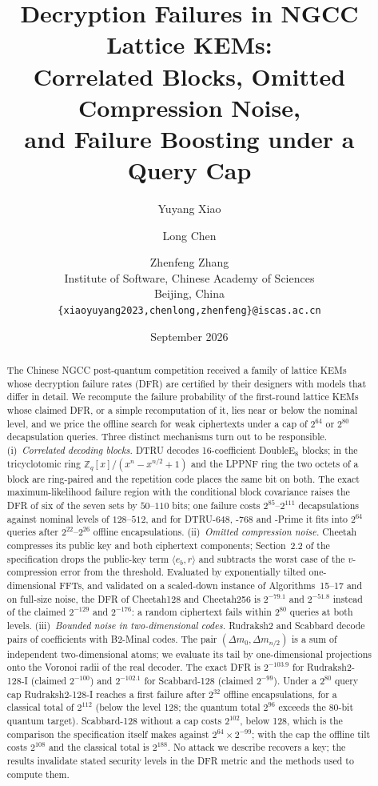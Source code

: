 \documentclass[11pt,a4paper]{article}
\title{Decryption Failures in NGCC Lattice KEMs:\\
Correlated Blocks, Omitted Compression Noise,\\
and Failure Boosting under a Query Cap}
\author{%
Yuyang Xiao \and Long Chen \and Zhenfeng Zhang\\
Institute of Software, Chinese Academy of Sciences\\
Beijing, China\\
\texttt{\{xiaoyuyang2023,chenlong,zhenfeng\}@iscas.ac.cn}}
\date{September 2026}
\theoremstyle{definition}
\theoremstyle{remark}
\newcommand{\Z}{\mathbb{Z}}
\begin{document}
\maketitle

\begin{abstract}
The Chinese NGCC post-quantum competition received a family of lattice KEMs
whose decryption failure rates (DFR) are certified by their designers with
models that differ in detail. We recompute the failure probability of the
first-round lattice KEMs whose claimed DFR, or a simple recomputation of it,
lies near or below the nominal level, and we price the offline search for
weak ciphertexts under a cap of $2^{64}$ or $2^{80}$ decapsulation queries.
Three distinct mechanisms turn out to be responsible.
(i)~\emph{Correlated decoding blocks.} DTRU decodes 16-coefficient
DoubleE$_8$ blocks; in the tricyclotomic ring $\Z_q[x]/(x^n-x^{n/2}+1)$ and
the LPPNF ring the two octets of a block are ring-paired and the repetition
code places the same bit on both. The exact maximum-likelihood failure region
with the conditional block covariance raises the DFR of six of the seven sets
by $50$--$110$ bits; one failure costs $2^{85}$--$2^{111}$ decapsulations
against nominal levels of $128$--$512$, and for DTRU-648, -768 and -Prime it
fits into $2^{64}$ queries after $2^{22}$--$2^{26}$ offline encapsulations.
(ii)~\emph{Omitted compression noise.} Cheetah compresses its public key and
both ciphertext components; Section~2.2 of the specification drops the
public-key term $\langle e_b,r\rangle$ and subtracts the worst case of the
$v$-compression error from the threshold. Evaluated by exponentially tilted
one-dimensional FFTs, and validated on a scaled-down instance of
Algorithms~15--17 and on full-size noise, the DFR of Cheetah128 and
Cheetah256 is $2^{-79.1}$ and $2^{-51.8}$ instead of the claimed $2^{-129}$
and $2^{-176}$: a random ciphertext fails within $2^{80}$ queries at both
levels.
(iii)~\emph{Bounded noise in two-dimensional codes.} Rudraksh2 and Scabbard
decode pairs of coefficients with B2-Minal codes. The pair
$(\Delta m_0,\Delta m_{n/2})$ is a sum of independent two-dimensional atoms;
we evaluate its tail by one-dimensional projections onto the Voronoi radii
of the real decoder. The exact DFR is $2^{-103.9}$ for Rudraksh2-128-I
(claimed $2^{-100}$) and $2^{-102.1}$ for Scabbard-128 (claimed $2^{-99}$).
Under a $2^{80}$ query cap Rudraksh2-128-I reaches a first failure after
$2^{32}$ offline encapsulations, for a classical total of $2^{112}$ (below
the level 128; the quantum total $2^{96}$ exceeds the 80-bit quantum
target). Scabbard-128 without a cap costs $2^{102}$, below 128, which is
the comparison the specification itself makes against $2^{64}\times 2^{-99}$;
with the cap the offline tilt costs $2^{108}$ and the classical total is
$2^{188}$. No attack we describe recovers a key; the results invalidate
stated security levels in the DFR metric and the methods used to compute
them.
\end{abstract}
\end{document}
